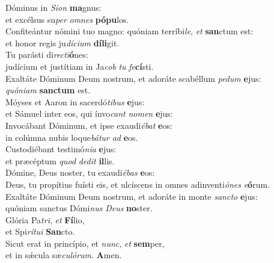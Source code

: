 \evenverse Dóminus in \textit{Si}\textit{on} \textbf{ma}gnus:~\*\\
\evenverse et excélsus su\textit{per} \textit{om}\textit{nes} \textbf{pó}\textbf{pu}los.\\
\oddverse Confiteántur nómini tuo magno: quóniam terríbi\textit{le}, \textit{et} \textbf{san}ctum est:~\*\\
\oddverse et honor regis ju\textit{dí}\textit{ci}\textit{um} \textbf{dí}\textbf{li}git.\\
\evenverse Tu parásti di\textit{re}\textit{cti}\textbf{ó}nes:~\*\\
\evenverse judícium et justítiam in Ja\textit{cob} \textit{tu} \textit{fe}\textbf{cí}sti.\\
\oddverse Exaltáte Dóminum Deum nostrum, et adoráte scabéllum \textit{pe}\textit{dum} \textbf{e}jus:~\*\\
\oddverse \textit{quó}\textit{ni}\textit{am} \textbf{san}\textbf{ctum} est.\\
\evenverse Móyses et Aaron in sacerdó\textit{ti}\textit{bus} \textbf{e}jus:~\*\\
\evenverse et Sámuel inter eos, qui ínvo\textit{cant} \textit{no}\textit{men} \textbf{e}jus:\\
\oddverse Invocábant Dóminum, et ipse exaudi\textit{é}\textit{bat} \textbf{e}os:~\*\\
\oddverse in colúmna nubis loque\textit{bá}\textit{tur} \textit{ad} \textbf{e}os.\\
\evenverse Custodiébant testimó\textit{ni}\textit{a} \textbf{e}jus:~\*\\
\evenverse et præcéptum \textit{quod} \textit{de}\textit{dit} \textbf{il}lis.\\
\oddverse Dómine, Deus noster, tu exaudi\textit{é}\textit{bas} \textbf{e}os:~\*\\
\oddverse Deus, tu propítius fuísti eis, et ulcíscens in omnes adinventi\textit{ó}\textit{nes} \textit{e}\textbf{ó}rum.\\
\evenverse Exaltáte Dóminum Deum nostrum, et adoráte in monte \textit{san}\textit{cto} \textbf{e}jus:~\*\\
\evenverse quóniam sanctus Dómi\textit{nus} \textit{De}\textit{us} \textbf{no}ster.\\
\oddverse Glória Pa\textit{tri}, \textit{et} \textbf{Fí}lio,~\*\\
\oddverse et Spi\textit{rí}\textit{tu}\textit{i} \textbf{San}cto.\\
\evenverse Sicut erat in princípio, et \textit{nunc}, \textit{et} \textbf{sem}per,~\*\\
\evenverse et in sǽcula sæ\textit{cu}\textit{ló}\textit{rum}. \textbf{A}men.\\
